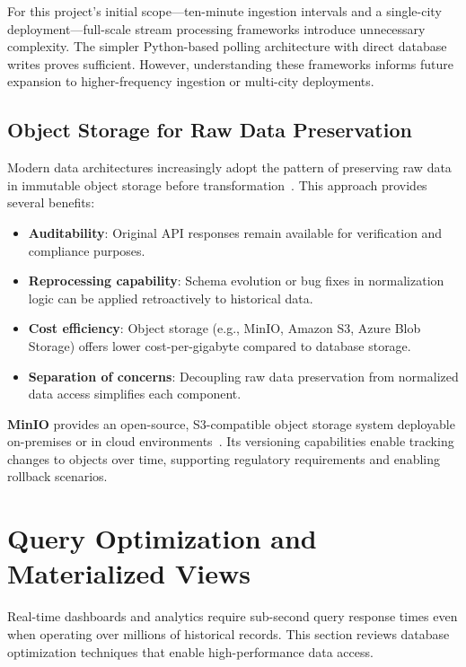 For this project's initial scope—ten-minute ingestion intervals and a single-city deployment—full-scale stream processing frameworks introduce unnecessary complexity. The simpler Python-based polling architecture with direct database writes proves sufficient. However, understanding these frameworks informs future expansion to higher-frequency ingestion or multi-city deployments.

\subsection{Object Storage for Raw Data Preservation}
\label{subsec:lit_object_storage}

Modern data architectures increasingly adopt the pattern of preserving raw data in immutable object storage before transformation~\citep{minio}. This approach provides several benefits:

\begin{itemize}
    \item \textbf{Auditability}: Original API responses remain available for verification and compliance purposes.
    \item \textbf{Reprocessing capability}: Schema evolution or bug fixes in normalization logic can be applied retroactively to historical data.
    \item \textbf{Cost efficiency}: Object storage (e.g., MinIO, Amazon S3, Azure Blob Storage) offers lower cost-per-gigabyte compared to database storage.
    \item \textbf{Separation of concerns}: Decoupling raw data preservation from normalized data access simplifies each component.
\end{itemize}

\textbf{MinIO} provides an open-source, S3-compatible object storage system deployable on-premises or in cloud environments~\citep{minio}. Its versioning capabilities enable tracking changes to objects over time, supporting regulatory requirements and enabling rollback scenarios.

\section{Query Optimization and Materialized Views}
\label{sec:lit_query_opt}

Real-time dashboards and analytics require sub-second query response times even when operating over millions of historical records. This section reviews database optimization techniques that enable high-performance data access.

